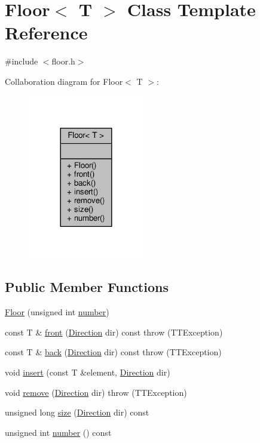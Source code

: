 \hypertarget{classFloor}{}\section{Floor$<$ T $>$ Class Template Reference}
\label{classFloor}


{\ttfamily \#include $<$floor.\+h$>$}



Collaboration diagram for Floor$<$ T $>$\+:
\nopagebreak
\begin{figure}[H]
\begin{center}
\leavevmode
\includegraphics[width=144pt]{classFloor__coll__graph}
\end{center}
\end{figure}
\subsection*{Public Member Functions}
\begin{DoxyCompactItemize}
\item 
\hyperlink{classFloor_a3a53ede7923b19d33787663dfce4d7ca}{Floor} (unsigned int \hyperlink{classFloor_a30de5259aa79b701c36897502b9b6295}{number})
\item 
const T \& \hyperlink{classFloor_aff584554fded633dc29a87a96f7840a7}{front} (\hyperlink{direction_8h_a224b9163917ac32fc95a60d8c1eec3aa}{Direction} dir) const   throw (\+T\+T\+Exception)
\item 
const T \& \hyperlink{classFloor_a641151d981cdb1e27e82980f255d72d3}{back} (\hyperlink{direction_8h_a224b9163917ac32fc95a60d8c1eec3aa}{Direction} dir) const   throw (\+T\+T\+Exception)
\item 
void \hyperlink{classFloor_aae2be662bce4dc3ca0c18e029d85d628}{insert} (const T \&element, \hyperlink{direction_8h_a224b9163917ac32fc95a60d8c1eec3aa}{Direction} dir)
\item 
void \hyperlink{classFloor_a728395aeeae56e45da8cb9b13066aed5}{remove} (\hyperlink{direction_8h_a224b9163917ac32fc95a60d8c1eec3aa}{Direction} dir)  throw (\+T\+T\+Exception)
\item 
unsigned long \hyperlink{classFloor_a271b299427f7d246cb055b4012cf173d}{size} (\hyperlink{direction_8h_a224b9163917ac32fc95a60d8c1eec3aa}{Direction} dir) const 
\item 
unsigned int \hyperlink{classFloor_a30de5259aa79b701c36897502b9b6295}{number} () const 
\end{DoxyCompactItemize}


